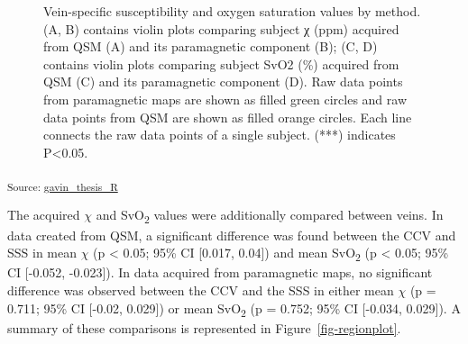 \documentclass[
sn-nature
]{sn-jnl}
\begin{document}
\begin{figure}[H]


\caption{\label{fig-methodplot}Vein-specific susceptibility and oxygen
saturation values by method. (A, B) contains violin plots comparing
subject χ (ppm) acquired from QSM (A) and its paramagnetic component
(B); (C, D) contains violin plots comparing subject SvO2 (\%) acquired
from QSM (C) and its paramagnetic component (D). Raw data points from
paramagnetic maps are shown as filled green circles and raw data points
from QSM are shown as filled orange circles. Each line connects the raw
data points of a single subject. (***) indicates P\textless0.05.}

\end{figure}%

\textsubscript{Source:
\href{https://WeberLab.github.io/Chisep_CSVO2_Manuscript/notebooks/gavin_thesis_markdown-preview.html\#cell-fig-methodplot}{gavin\_thesis\_R}}

The acquired \(\chi\) and SvO\textsubscript{2} values were additionally
compared between veins. In data created from QSM, a significant
difference was found between the CCV and SSS in mean \(\chi\) (p
\textless{} 0.05; 95\% CI {[}0.017, 0.04{]}) and mean
SvO\textsubscript{2} (p \textless{} 0.05; 95\% CI {[}-0.052, -0.023{]}).
In data acquired from paramagnetic maps, no significant difference was
observed between the CCV and the SSS in either mean \(\chi\) (p = 0.711;
95\% CI {[}-0.02, 0.029{]}) or mean SvO\textsubscript{2} (p = 0.752;
95\% CI {[}-0.034, 0.029{]}). A summary of these comparisons is
represented in Figure~\ref{fig-regionplot}.
\end{document}
